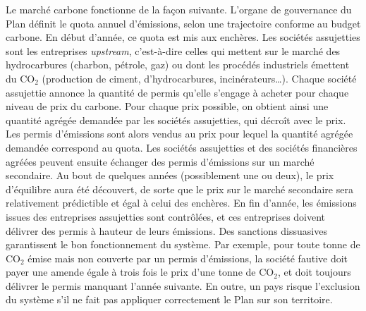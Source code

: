 \documentclass[a5paper,french,openany]{memoir}
\begin{document}
Le marché carbone fonctionne de la façon suivante. 
L'organe de gouvernance du Plan définit le quota annuel d'émissions, selon une trajectoire conforme au budget carbone. En début d'année, ce quota est mis aux enchères. %
Les sociétés assujetties sont les entreprises \textit{upstream}, c'est-à-dire celles qui mettent sur le marché des hydrocarbures (charbon, pétrole, gaz) ou dont les procédés industriels émettent du CO$_\text{2}$ (production de ciment, d'hydrocarbures, incinérateurs\dots). 
Chaque société assujettie annonce la quantité de permis qu'elle s'engage à acheter pour chaque niveau de prix du carbone. Pour chaque prix possible, on obtient ainsi une quantité agrégée demandée par les sociétés assujetties, qui décroît avec le prix. Les permis d'émissions sont alors vendus au prix pour lequel la quantité agrégée demandée correspond au quota. Les sociétés assujetties et des sociétés financières agréées peuvent ensuite échanger des permis d'émissions sur un marché secondaire. Au bout de quelques années (possiblement une ou deux), 
le prix d'équilibre aura été découvert, de sorte que le prix sur le marché secondaire sera relativement prédictible et égal à celui des enchères. En fin d'année, les émissions issues des entreprises assujetties sont contrôlées, et ces entreprises doivent délivrer des permis à hauteur de leurs émissions. %
Des sanctions dissuasives garantissent le bon fonctionnement du système. Par exemple, pour toute tonne de CO$_\text{2}$ émise mais non couverte par un permis d'émissions, la société fautive doit payer une amende égale à trois fois le prix d'une tonne de CO$_\text{2}$, et doit toujours délivrer le permis manquant l'année suivante. En outre, un pays risque l'exclusion du système s'il ne fait pas appliquer correctement le Plan sur son territoire. %
\end{document}
